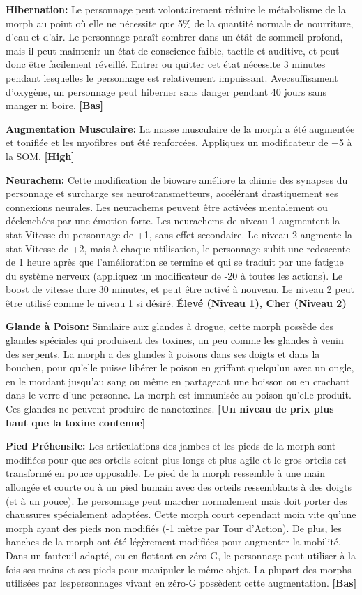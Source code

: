 \textbf{Hibernation:} Le personnage peut volontairement réduire le métabolisme de la morph au point où elle ne nécessite que 5\% de la quantité normale de nourriture, d'eau et d'air. Le personnage paraît sombrer dans un étât de sommeil profond, mais il peut maintenir un état de conscience faible, tactile et auditive, et peut donc être facilement réveillé. Entrer ou quitter cet état nécessite 3 minutes pendant lesquelles le personnage est relativement impuissant. Avecsuffisament d'oxygène, un personnage peut hiberner sans danger pendant 40 jours sans manger ni boire. \textbf{[Bas]} 

\textbf{Augmentation Musculaire:} La masse musculaire de la morph a été augmentée et tonifiée et les myofibres ont été renforcées. Appliquez un modificateur de +5 à la SOM. \textbf{[High]} 

\textbf{Neurachem:} Cette modification de bioware améliore la chimie des synapses du personnage et surcharge ses neurotransmetteurs, accélérant drastiquement ses connexions neurales. Les neurachems peuvent être activées mentalement ou déclenchées par une émotion forte. Les neurachems de niveau 1 augmentent la stat Vitesse du personnage de +1, sans effet secondaire. Le niveau 2 augmente la stat Vitesse de +2, mais à chaque utilisation, le personnage subit une redescente de 1 heure après que l'amélioration se termine et qui se traduit par une fatigue du système nerveux (appliquez un modificateur de -20 à toutes les actions).
Le boost de vitesse dure 30 minutes, et peut être activé à nouveau. Le niveau 2 peut être utilisé comme le niveau 1 si désiré.
\textbf{{Élevé (Niveau 1), Cher (Niveau 2)}} 

\textbf{Glande à Poison:} Similaire aux glandes à drogue, cette morph possède des glandes spéciales qui produisent des toxines, un peu comme les glandes à venin des serpents. La morph a des glandes à poisons dans ses doigts et dans la bouchen, pour qu'elle puisse libérer le poison en griffant quelqu'un avec un ongle, en le mordant jusqu'au sang ou même en partageant une boisson ou en crachant dans le verre d'une personne. La morph est immunisée au poison qu'elle produit. Ces glandes ne peuvent produire de nanotoxines. \textbf{[Un niveau de prix plus haut que la toxine contenue]} 

\textbf{Pied Préhensile:} Les articulations des jambes et les pieds de la morph sont modifiées pour que ses orteils soient plus longs et plus agile et le gros orteils est transformé en pouce opposable. Le pied de la morph ressemble à une main allongée et courte ou à un pied humain avec des orteils ressemblants à des doigts (et à un pouce). Le personnage peut marcher normalement mais doit porter des chaussures spécialement adaptées. Cette morph court cependant moin vite qu'une morph ayant des pieds non modifiés (-1 mètre par Tour d'Action). De plus, les hanches de la morph ont été légèrement modifiées pour augmenter la mobilité. Dans un fauteuil adapté, ou en flottant en zéro-G, le personnage peut utiliser à la fois ses mains et ses pieds pour manipuler le même objet. La plupart des morphs utilisées par lespersonnages vivant en zéro-G possèdent cette augmentation. \textbf{[Bas]} 

